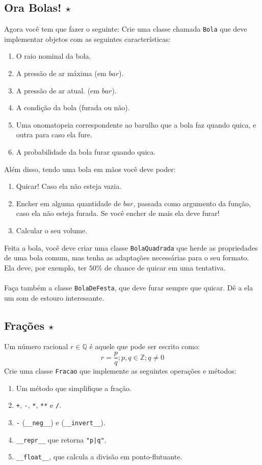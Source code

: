 \documentclass[12pt]{article}
\newcommand{\mono}[1]{\texttt{#1}}
\newcommand{\spm}[1]{\mono{\_\_#1\_\_}}
\begin{document}
		\subsection{Ora Bolas! $\star$}
	Agora você tem que fazer o seguinte: Crie uma classe chamada \mono{Bola} que deve implementar objetos com as seguintes características:
	\begin{enumerate}
		\item O raio nominal da bola.
		\item A pressão de ar máxima (em $bar$).
		\item A pressão de ar atual. (em $bar$).
		\item A condição da bola (furada ou não).
		\item Uma onomatopeia correspondente ao barulho que a bola faz quando quica, e outra para caso ela fure.
		\item A probabilidade da bola furar quando quica.
	\end{enumerate}
	Além disso, tendo uma bola em mãos você deve poder:
	\begin{enumerate}
		\item Quicar! Caso ela não esteja vazia.
		\item Encher em alguma quantidade de $bar$, passada como argumento da função, caso ela não esteja furada. Se você encher de mais ela deve furar!
		\item Calcular o seu volume.
	\end{enumerate}
	Feita a bola, você deve criar uma classe \mono{BolaQuadrada} que herde as propriedades de uma bola comum, mas tenha as adaptações necessárias para o seu formato. Ela deve, por exemplo, ter $50\%$ de chance de quicar em uma tentativa.
	\\ \\
	Faça também a classe \mono{BolaDeFesta}, que deve furar sempre que quicar. Dê a ela um som de estouro interessante.
	
	\subsection{Frações $\star$}
	Um número racional $r \in \mathbb{Q}$ é aquele que pode ser escrito como: 
	\[r = \frac{p}{q} ; p,q \in \mathbb{Z} ; q \neq 0\]
	Crie uma classe \mono{Fracao} que implemente as seguintes operações e métodos:
	\begin{enumerate}
		\item Um método que simplifique a fração.
		\item \mono{+}, \mono{-}, \mono{*}, \mono{**} e \mono{/}.
		\item \mono{-} (\spm{neg}) e \mono{\texttildelow} (\spm{invert}).
		\item \spm{repr} que retorna \mono{"p|q"}.
		\item \spm{float}, que calcula a divisão em ponto-flutuante.
	\end{enumerate}
\end{document}
